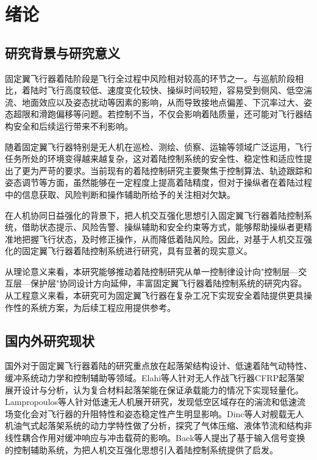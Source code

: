 \chapter{绪论}

\section{研究背景与研究意义}

固定翼飞行器着陆阶段是飞行全过程中风险相对较高的环节之一。与巡航阶段相比，着陆时飞行高度较低、速度变化较快、操纵时间较短，容易受到侧风、低空湍流、地面效应以及姿态扰动等因素的影响，从而导致接地点偏差、下沉率过大、姿态超限和滑跑偏移等问题。若控制不当，不仅会影响着陆质量，还可能对飞行器结构安全和后续运行带来不利影响。

随着固定翼飞行器特别是无人机在巡检、测绘、侦察、运输等领域广泛运用，飞行任务所处的环境变得越来越复杂，这对着陆控制系统的安全性、稳定性和适应性提出了更为严苛的要求。当前现有的着陆控制研究主要聚焦于控制算法、轨迹跟踪和姿态调节等方面，虽然能够在一定程度上提高着陆精度，但对于操纵者在着陆过程中的信息获取、风险判断和操作辅助所给予的关注相对欠缺。

在人机协同日益强化的背景下，把人机交互强化思想引入固定翼飞行器着陆控制系统，借助状态提示、风险告警、操纵辅助和安全约束等方式，能够帮助操纵者更精准地把握飞行状态，及时修正操作，从而降低着陆风险。因此，对基于人机交互强化的固定翼飞行器着陆控制系统进行研究，具有显著的现实意义。

从理论意义来看，本研究能够推动着陆控制研究从单一控制律设计向"控制层—交互层—保护层"协同设计方向延伸，丰富固定翼飞行器着陆控制系统的研究内容。从工程意义来看，本研究可为固定翼飞行器在复杂工况下实现安全着陆提供更具操作性的系统方案，为后续工程应用提供参考。

\section{国内外研究现状}

国外对于固定翼飞行器着陆的研究重点放在起落架结构设计、低速着陆气动特性、缓冲系统动力学和控制辅助等领域。Elahi等人针对无人作战飞行器CFRP起落架展开设计与分析，认为复合材料起落架能在保证承载能力的情况下实现轻量化。Lampropoulos等人针对低速无人机展开研究，发现低空区域存在的湍流和低速流场变化会对飞行器的升阻特性和姿态稳定性产生明显影响。Dinc等人对舰载无人机油气式起落架系统的动力学特性做了分析，探究了气体压缩、液体节流和结构非线性耦合作用对缓冲响应与冲击载荷的影响。Baek等人提出了基于输入信号变换的控制辅助系统，为把人机交互强化思想引入着陆控制系统提供了启发。

